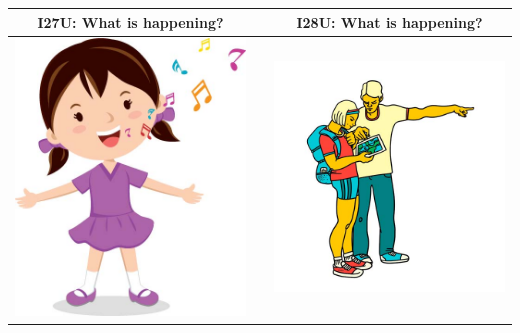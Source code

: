 \documentclass[12pt,notitlepage]{article}
\begin{document}
\begin{center}
\begin{tabular}{|c|c|c|}
\hline
I27U: What is happening? && I28U: What is happening? \\
\hline
\includegraphics[width=20em,trim=0 0 0 -3]{figures/I27.jpg} & & \includegraphics[width=20em,trim=0 0 0 -3]{figures/I28.jpg} \\
\hline
\end{tabular}
\vspace{1em} \\



\end{center}
\end{document}
